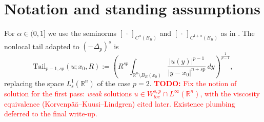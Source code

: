 \documentclass[11pt]{amsart}
\theoremstyle{plain}
\theoremstyle{definition}
\theoremstyle{remark}
\newcommand{\R}{\mathbb{R}}
\newcommand{\fpl}[1]{(-\Delta_p)^{s}#1}            %
\newcommand{\al}{\alpha}
\newcommand{\Tail}{\mathrm{Tail}_{p-1,sp}}
\newcommand{\TODO}[1]{\textcolor{red}{\textbf{TODO:} #1}}
\begin{document}
\section{Notation and standing assumptions}
For $\al\in(0,1]$ we use the seminorms $[\,\cdot\,]_{C^{\al}(B_R)}$ and
$[\,\cdot\,]_{C^{1+\al}(B_R)}$ as in \cite[Sec.~2]{PTU}.
The nonlocal tail adapted to $\fpl{}$ is
\[
  \Tail(u;x_0,R)
  := \left( R^{sp} \int_{\R^n\setminus B_R(x_0)}
       \frac{|u(y)|^{p-1}}{|y-x_0|^{n+sp}}\,dy \right)^{\!\frac{1}{p-1}},
\]
replacing the space $L^1_s(\R^n)$ of the case $p=2$.
\TODO{Fix the notion of solution for the first pass: \emph{weak} solutions
$u\in W^{s,p}_{loc}\cap L^\infty(\R^n)$, with the viscosity equivalence
(Korvenp\"a\"a--Kuusi--Lindgren) cited later. Existence plumbing deferred
to the final write-up.}
\end{document}
